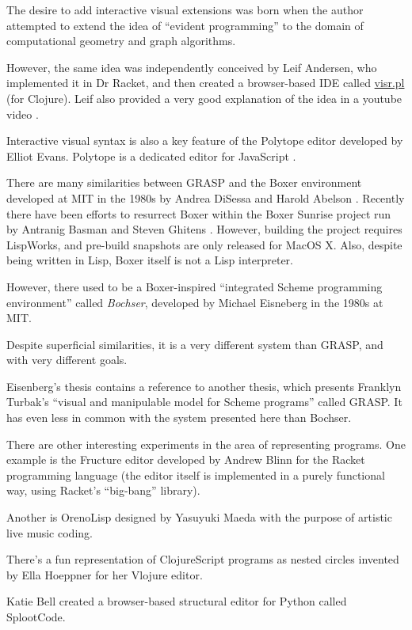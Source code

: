 \documentclass[sigconf]{acmart}
\begin{document}
The desire to add interactive visual extensions
was born when the author attempted to extend
the idea of ``evident programming'' to the domain
of computational geometry and graph algorithms.

However, the same idea was independently
conceived by Leif Andersen, who implemented
it in Dr Racket, and then created a browser-based
IDE called \url{visr.pl} (for Clojure). Leif also provided
a very good explanation of the idea in a youtube video \cite{Andersen}.

Interactive visual syntax is also a key feature
of the Polytope editor developed by Elliot Evans.
Polytope is a dedicated editor for JavaScript \cite{Evans}.

There are many similarities between GRASP and
the Boxer environment developed at MIT in the 1980s
by Andrea DiSessa and Harold Abelson \cite{Boxer}. Recently
there have been efforts to resurrect Boxer
within the Boxer Sunrise project run by Antranig
Basman and Steven Ghitens \cite{BoxerSunrise}. However, building
the project requires LispWorks, and pre-build
snapshots are only released for MacOS X. Also,
despite being written in Lisp, Boxer itself
is not a Lisp interpreter.

However, there used to be a Boxer-inspired ``integrated Scheme
programming environment'' called \textit{Bochser},
developed by Michael Eisneberg in the 1980s at MIT\cite{Bochser}.

Despite superficial similarities, it is a very different
system than GRASP, and with very different goals.

Eisenberg's thesis contains a reference to another
thesis, which presents Franklyn Turbak's ``visual
and manipulable model for Scheme programs'' called
GRASP\cite{Turbak}. It has even less in common
with the system presented here than Bochser.

There are other interesting experiments
in the area of representing programs.
One example is the Fructure editor developed
by Andrew Blinn for the Racket programming
language (the editor itself is implemented
in a purely functional way, using Racket's
``big-bang'' library)\cite{Blinn}.

Another is OrenoLisp designed by Yasuyuki
Maeda with the purpose of artistic live
music coding\cite{Maeda}.

There's a fun representation of ClojureScript
programs as nested circles invented by Ella
Hoeppner for her Vlojure editor\cite{Hoeppner}.

Katie Bell created a browser-based structural
editor for Python called SplootCode\cite{Bell}.
\end{document}
